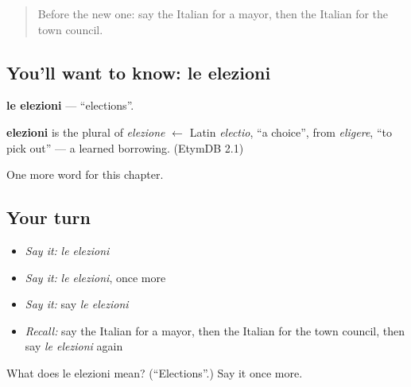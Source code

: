 \label{lesson:IT-C161-elezioni}



\begin{quote}
Before the new one: say the Italian for a mayor, then the Italian for the town council.
\end{quote}

\subsection*{You'll want to know: le elezioni}
\textbf{le elezioni} — \textquotedblleft{}elections\textquotedblright{}.

\begin{cousinweb}
\textbf{elezioni} is the plural of \emph{elezione} $\leftarrow$ Latin \emph{electio}, \textquotedblleft{}a choice\textquotedblright{}, from \emph{eligere}, \textquotedblleft{}to pick out\textquotedblright{} — a learned borrowing. (EtymDB 2.1)
\end{cousinweb}

\begin{grammarlens}[title={What you've built}]
One more word for this chapter.
\end{grammarlens}

\subsection*{Your turn}
\begin{itemize}
\raggedright
  \item \emph{Say it:} \emph{le elezioni}
  \item \emph{Say it:} \emph{le elezioni}, once more
  \item \emph{Say it:} say \emph{le elezioni}
  \item \emph{Recall:} say the Italian for a mayor, then the Italian for the town council, then say \emph{le elezioni} again
\end{itemize}

\begin{tcolorbox}[breakable,colback=teal!4,colframe=teal!35!black,title={Before you move on}]
What does le elezioni mean? (\textquotedblleft{}Elections\textquotedblright{}.) Say it once more.
\end{tcolorbox}

